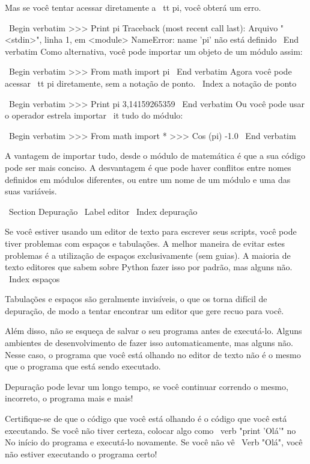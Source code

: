 \documentclass[10pt]{book}
\begin{document}
{Mas se você tentar acessar diretamente a {\ tt pi}, você obterá um erro.

\ Begin {verbatim}
>>> Print pi
Traceback (most recent call last):
  Arquivo "<stdin>", linha 1, em <module>
NameError: name 'pi' não está definido
\ End {verbatim}
%
Como alternativa, você pode importar um objeto de um módulo assim:

\ Begin {verbatim}
>>> From math import pi
\ End {verbatim}
%
Agora você pode acessar {\ tt pi} diretamente, sem a notação de ponto.
\ Index {} a notação de ponto

\ Begin {verbatim}
>>> Print pi
3,14159265359
\ End {verbatim}
%
Ou você pode usar o operador estrela importar {\ it tudo} do
módulo:

\ Begin {verbatim}
>>> From math import *
>>> Cos (pi)
-1.0
\ End {verbatim}

A vantagem de importar tudo, desde o módulo de matemática é que a sua
código pode ser mais conciso. A desvantagem é que pode haver
conflitos entre nomes definidos em módulos diferentes, ou entre
um nome de um módulo e uma das suas variáveis.


\ Section {} Depuração
\ Label {editor}
\ Index {depuração}

Se você estiver usando um editor de texto para escrever seus scripts, você pode
tiver problemas com espaços e tabulações. A melhor maneira de evitar
estes problemas é a utilização de espaços exclusivamente (sem guias). A maioria de texto
editores que sabem sobre Python fazer isso por padrão, mas alguns
não.
\ Index {espaços}

Tabulações e espaços são geralmente invisíveis, o que os torna
difícil de depuração, de modo a tentar encontrar um editor que gere recuo
para você.

Além disso, não se esqueça de salvar o seu programa antes de executá-lo. Alguns
ambientes de desenvolvimento de fazer isso automaticamente, mas alguns não.
Nesse caso, o programa que você está olhando no editor de texto
não é o mesmo que o programa que está sendo executado.

Depuração pode levar um longo tempo, se você continuar correndo o mesmo,
incorreto, o programa mais e mais!

Certifique-se de que o código que você está olhando é o código que você está executando.
Se você não tiver certeza, colocar algo como \ verb "print 'Olá'" no
No início do programa e executá-lo novamente. Se você não vê
\ Verb "Olá", você não estiver executando o programa certo!




}
\end{document}

